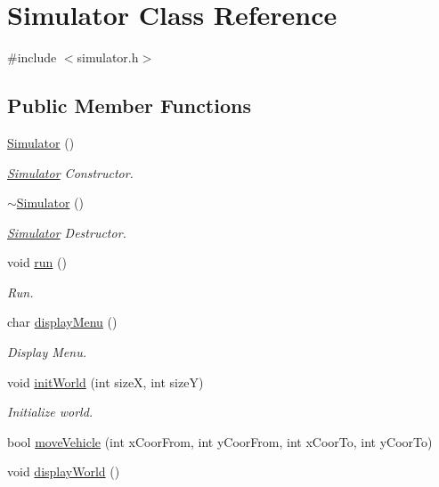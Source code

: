 \hypertarget{class_simulator}{}\section{Simulator Class Reference}
\label{class_simulator}


{\ttfamily \#include $<$simulator.\+h$>$}

\subsection*{Public Member Functions}
\begin{DoxyCompactItemize}
\item 
\hyperlink{class_simulator_a031573bfcfe2e0f5c9539bcc1c7fc5d9}{Simulator} ()
\begin{DoxyCompactList}\small\item\em \hyperlink{class_simulator}{Simulator} Constructor. \end{DoxyCompactList}\item 
\hyperlink{class_simulator_a0f49aa04f42060a785adf77346b9de9f}{$\sim$\+Simulator} ()
\begin{DoxyCompactList}\small\item\em \hyperlink{class_simulator}{Simulator} Destructor. \end{DoxyCompactList}\item 
void \hyperlink{class_simulator_aa2de7e32b04cc3e8fc60aec23997621b}{run} ()
\begin{DoxyCompactList}\small\item\em Run. \end{DoxyCompactList}\item 
char \hyperlink{class_simulator_aa6bb404bb0e612f3fa498c674f18dd21}{display\+Menu} ()
\begin{DoxyCompactList}\small\item\em Display Menu. \end{DoxyCompactList}\item 
void \hyperlink{class_simulator_a4eab2fe9f882b52f06d3635bb7b7ce76}{init\+World} (int sizeX, int sizeY)
\begin{DoxyCompactList}\small\item\em Initialize world. \end{DoxyCompactList}\item 
bool \hyperlink{class_simulator_afbce79bf2c4d38959da81693df3d3d29}{move\+Vehicle} (int x\+Coor\+From, int y\+Coor\+From, int x\+Coor\+To, int y\+Coor\+To)
\item 
void \hyperlink{class_simulator_a4bdab90628ce0acf61f27f351665ff52}{display\+World} ()
\end{DoxyCompactItemize}
